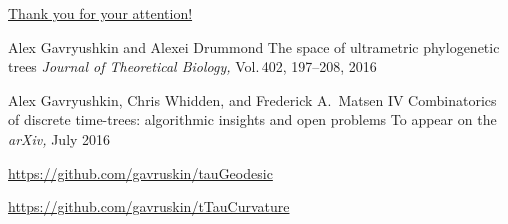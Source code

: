 \documentclass{beamer}
\theoremstyle{example}
\begin{document}
\begin{frame}{\href{http://alex.gavruskin.com/pictures/}{\Large{Thank
you for your attention!}}}


\scriptsize

Alex Gavryushkin and Alexei Drummond
\newblock The space of ultrametric phylogenetic trees
\newblock \emph{Journal of Theoretical Biology,} Vol.\,402, 197--208, 2016

Alex Gavryushkin, Chris Whidden, and Frederick A.\ Matsen IV
\newblock Combinatorics of discrete time-trees: algorithmic insights and open problems
\newblock To appear on the {\em arXiv,} July 2016

\url{https://github.com/gavruskin/tauGeodesic}

\url{https://github.com/gavruskin/tTauCurvature}
\end{frame}
\end{document}
